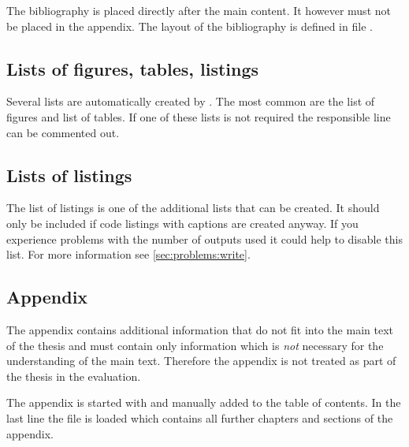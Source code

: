 The bibliography is placed directly after the main content. It however must 
not be placed in the appendix. The layout of the bibliography is defined in 
file .
%

\subsection{Lists of figures, tables, listings}
\label{sec:document:lists}

Several lists are automatically created by \latex. The most common are the list of figures and list of tables. If one of these lists is not required the responsible line can be commented out. 
%

\subsection{Lists of listings}
\label{sec:document:listings}

The list of listings is one of the additional lists that can be created. 
It should only be included if code listings with captions are created anyway.
If you experience problems with the number of  outputs used it could
help to disable this list.
For more information see \cref{sec:problems:write}.


\subsection{Appendix}
\label{sec:document:appendix}

The appendix contains additional information that do not fit into the main text of the thesis and must contain only information which is \emph{not} necessary for the understanding of the main text. Therefore the appendix is not treated as part of the thesis in the evaluation.

The appendix is started with  and manually added to the table of contents. In the last line the file  is loaded which contains all further chapters and sections of the appendix.
%


